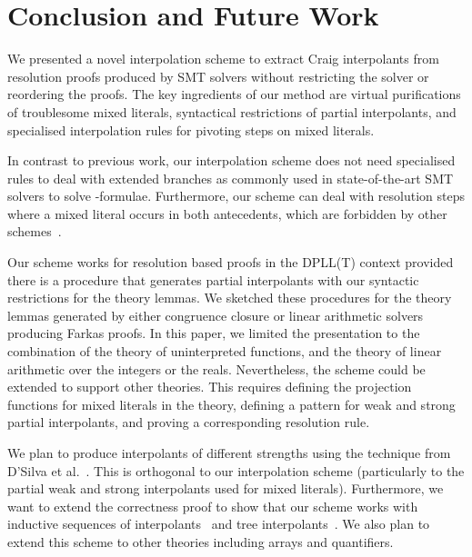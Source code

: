 \section{Conclusion and Future Work}

We presented a novel interpolation scheme to extract Craig interpolants from
resolution proofs produced by SMT solvers without restricting the solver or
reordering the proofs.  The key ingredients of our method are virtual
purifications of troublesome mixed literals, syntactical restrictions of
partial interpolants, and specialised interpolation rules for pivoting steps
on mixed literals.

In contrast to previous work, our interpolation scheme does not need
specialised rules to deal with extended branches as commonly used in
state-of-the-art SMT solvers to solve \laz-formulae.  Furthermore, our scheme
can deal with resolution steps where a mixed literal occurs in both
antecedents, which are forbidden by other schemes~\cite{Cimatti2010,Goel2009}.

Our scheme works for resolution based proofs in the DPLL(T) context provided
there is a procedure that generates partial interpolants with our syntactic
restrictions for the theory lemmas.  We sketched these procedures for the
theory lemmas generated by either congruence closure or linear arithmetic solvers
producing Farkas proofs. 
In this paper, we limited the presentation to the combination of the theory of
uninterpreted functions, and the theory of linear arithmetic over the integers
or the reals.  Nevertheless, the scheme could be extended to support other
theories.  This requires defining the projection functions for mixed
literals in the theory, defining a pattern for 
\ifnewinterpolation\else weak and strong \fi partial
interpolants, and proving a corresponding resolution rule.

We plan to produce interpolants of different strengths using the
technique from D'Silva et al.~\cite{D'Silva2010}.  This is orthogonal to our
interpolation scheme (particularly to the 
\ifnewinterpolation partial \else weak and strong \fi
interpolants used for mixed literals).
Furthermore, we want to extend the correctness proof to show that our scheme 
works with inductive sequences of interpolants~\cite{mcmillan06lai} and tree
interpolants~\cite{HHP10}. We also plan to extend this scheme to other theories
including arrays and quantifiers.
